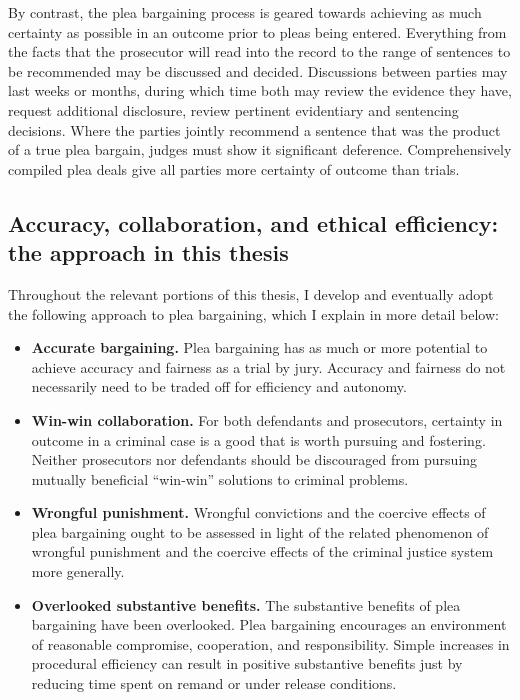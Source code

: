 By contrast, the plea bargaining process is geared towards achieving as much certainty as possible in an outcome prior to pleas being entered. Everything from the facts that the prosecutor will read into the record to the range of sentences to be recommended may be discussed and decided. Discussions between parties may last weeks or months, during which time both may review the evidence they have, request additional disclosure, review pertinent evidentiary and sentencing decisions. Where the parties jointly recommend a sentence that was the product of a true plea bargain, judges must show it significant deference. Comprehensively compiled plea deals give all parties more certainty of outcome than trials.

\subsection{Accuracy, collaboration, and ethical efficiency: the approach in this thesis}

Throughout the relevant portions of this thesis, I develop and eventually adopt the following approach to plea bargaining, which I explain in more detail below:

\begin{itemize}
\item \textbf{Accurate bargaining.} Plea bargaining has as much or more potential to achieve accuracy and fairness as a trial by jury. Accuracy and fairness do not necessarily need to be traded off for efficiency and autonomy.
\item \textbf{Win-win collaboration.} For both defendants and prosecutors, certainty in outcome in a criminal case is a good that is worth pursuing and fostering. Neither prosecutors nor defendants should be discouraged from pursuing mutually beneficial ``win-win'' solutions to criminal problems.
\item \textbf{Wrongful punishment.} Wrongful convictions and the coercive effects of plea bargaining ought to be assessed in light of the related phenomenon of wrongful punishment and the coercive effects of the criminal justice system more generally.
\item \textbf{Overlooked substantive benefits.} The substantive benefits of plea bargaining have been overlooked. Plea bargaining encourages an environment of reasonable compromise, cooperation, and responsibility. Simple increases in procedural efficiency can result in positive substantive benefits just by reducing time spent on remand or under release conditions.
\end{itemize}

